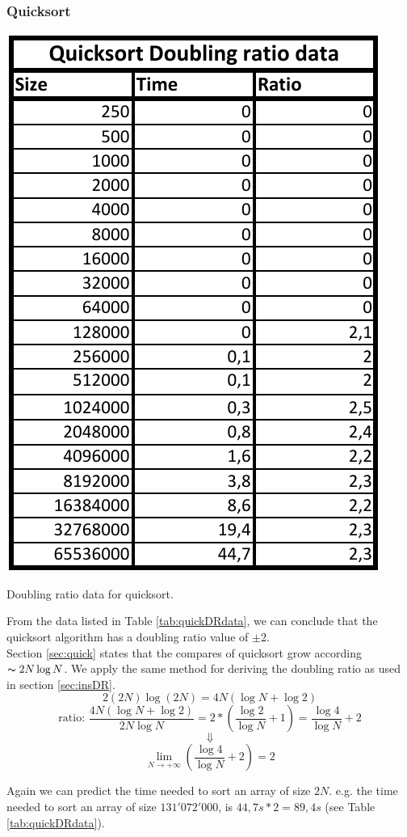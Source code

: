 \documentclass[pdftex,11pt,a4paper,english,titlepage]{article}
\begin{document}
		\subsubsection{Quicksort}
\begin{table}[H]
	\centering
	\includegraphics[scale=1]{quickDRdata.pdf}
	\caption{Doubling ratio data for quicksort.\label{tab:quickDRdata}}
\end{table}

From the data listed in Table \ref{tab:quickDRdata}, we can conclude that the quicksort algorithm has a doubling ratio value of $\pm$2.\\

Section \ref{sec:quick} states that the compares of quicksort grow according $\thicksim 2N\log N$. We apply the same method for deriving the doubling ratio as used in section \ref{sec:insDR}. $$2(2N)\log (2N)=4N(\log N + \log 2)$$
$$\text{ratio: } \frac{4N(\log N + \log 2)}{2N\log N} = 2*(\frac{\log 2}{\log N} + 1)= \frac{\log 4}{\log N}+2$$
$$\Downarrow$$  
$$\lim_{N \to +\infty}(\frac{\log 4}{\log N}+2) = 2$$

Again we can predict the time needed to sort an array of size $2N$. e.g. the time needed to sort an array of size $131'072'000$, is $44{,}7s*2 = 89{,}4s$ (see Table \ref{tab:quickDRdata}).

\newpage


\end{document}
